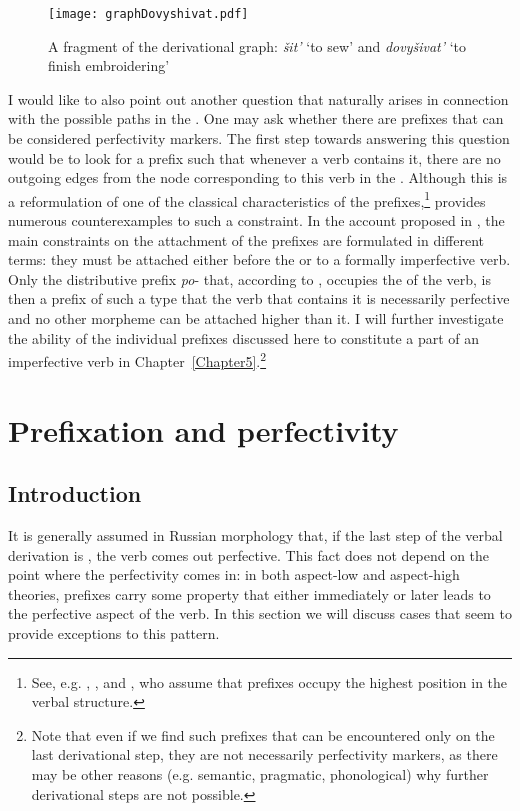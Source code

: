 \begin{figure}
\begin{center}
\texttt{[image: graphDovyshivat.pdf]}
\caption{A fragment of the derivational graph: \textit{\v{s}it'} `to sew' and \textit{dovy\v{s}ivat'} `to finish embroidering'\label{tree:dovyshivat}}
\end{center}
\end{figure}		

I would like to also point out another question that naturally arises in connection with the possible paths in the . One may ask whether there are prefixes that can be considered perfectivity markers. The first step towards answering this question would be to look for a prefix such that whenever a verb contains it, there are no outgoing edges from the node corresponding to this verb in the . Although this is a reformulation of one of the classical characteristics of the  prefixes,\footnote{See, e.g. \citet{Ramchand:04}, \citet{Svenonius:04a}, and \citet{Romanova:06}, who assume that  prefixes occupy the highest position in the verbal structure.} \citet{Tatevosov:07, Tatevosov:09} provides numerous counterexamples to such a constraint. In the account proposed in \citealt{Tatevosov:09}, the main constraints on the attachment of the  prefixes are formulated in different terms: they must be attached either before the  or to a formally imperfective verb. Only the distributive prefix \textit{po}- that, according to \citet{Tatevosov:09}, occupies the  of the verb, is then a prefix of such a type that the verb that contains it is necessarily perfective and no other morpheme can be attached higher than it. I will further investigate the ability of the individual prefixes discussed here to constitute a part of an imperfective verb in Chapter~\ref{Chapter5}.\footnote{Note that even if we find such prefixes that can be encountered only on the last derivational step, they are not necessarily perfectivity markers, as there may be other reasons (e.g. semantic, pragmatic, phonological) why further derivational steps are not possible.}

\section{Prefixation and perfectivity}\label{section:new:perfectivity}

\subsection{Introduction}
It is generally assumed in Russian morphology that, if the last step of the verbal derivation is , the verb comes out perfective. This fact does not depend on the point where the perfectivity comes in: in both aspect-low \citep[][among others]{Verkuyl:95, Pinon:01, Ramchand:04} and aspect-high \citep{Paslawska:03, Gronn:10, Tatevosov:11} theories, prefixes carry some property that either immediately or later leads to the perfective aspect of the verb. In this section we will discuss cases that seem to provide exceptions to this pattern.

